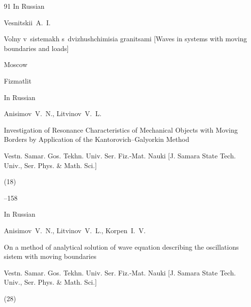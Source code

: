 \begin{thebibliography}{91}
\lang In Russian

\by Vesnitskii~A.~I.

\book Volny v~sistemakh s~dvizhushchimisia granitsami \rm [Waves in systems with moving boundaries and loads]

\publaddr Moscow

\publ Fizmatlit






\lang In Russian

\by Anisimov~V.~N., Litvinov~V.~L.

\paper Investigation of Resonance Characteristics of Mechanical Objects with Moving Borders by Application of the Kantorovich--Galyorkin Method

\jour Vestn. Samar. Gos. Tekhn. Univ. Ser. Fiz.-Mat. Nauki \rm [J. Samara State Tech. Univ., Ser. Phys. \& Math. Sci.]


(18)

--158


%











\lang In Russian

\by Anisimov~V.~N., Litvinov~V.~L., Korpen~I.~V.

\paper On a method of analytical solution of wave equation describing the oscillations sistem with moving boundaries

\jour Vestn. Samar. Gos. Tekhn. Univ. Ser. Fiz.-Mat. Nauki \rm [J. Samara State Tech. Univ., Ser. Phys. \& Math. Sci.]


(28)


\end{thebibliography}
